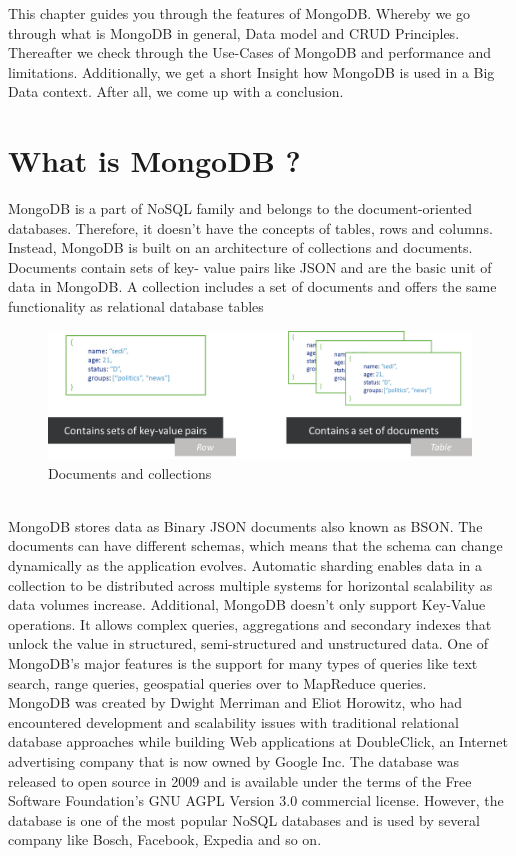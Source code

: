 This chapter guides you through the features of MongoDB. Whereby we go through what is MongoDB in general, Data model and CRUD Principles. Thereafter we check through the Use-Cases of MongoDB and performance and limitations. Additionally, we get a short Insight how MongoDB is used in a Big Data context. After all, we come up with a conclusion.

\section{What is MongoDB ?}
MongoDB is a part of NoSQL family and belongs to the document-oriented databases. Therefore, it doesn’t have the concepts of tables, rows and columns. Instead, MongoDB is built on an architecture of collections and documents. Documents contain sets of key- value pairs like JSON and are the basic unit of data in MongoDB. A collection includes a set of documents and offers the same functionality as relational database tables\cite{Banker2016}
\begin{figure}[H]
\includegraphics[width=\linewidth,keepaspectratio]{images/documentscollections.png}
\caption{Documents and collections}
\end{figure}
\\
MongoDB stores data as Binary JSON documents also known as BSON. The documents can have different schemas, which means that the schema can change dynamically as the application evolves. Automatic sharding enables data in a collection to be distributed across multiple systems for horizontal scalability as data volumes increase\cite{Edward2015}. Additional, MongoDB doesn’t only support Key-Value operations. It allows complex queries, aggregations and secondary indexes that unlock the value in structured, semi-structured and unstructured data. One of MongoDB’s major features is the support for many types of queries like text search, range queries, geospatial queries over to MapReduce queries\cite{MongoDBInc.2013a}.
\\
MongoDB was created by Dwight Merriman and Eliot Horowitz, who had encountered development and scalability issues with traditional relational database approaches while building Web applications at DoubleClick, an Internet advertising company that is now owned by Google Inc. The database was released to open source in 2009 and is available under the terms of the Free Software Foundation's GNU AGPL Version 3.0 commercial license. However, the database is one of the most popular NoSQL databases and is used by several company like Bosch, Facebook, Expedia and so on\cite{Hows2013}.


